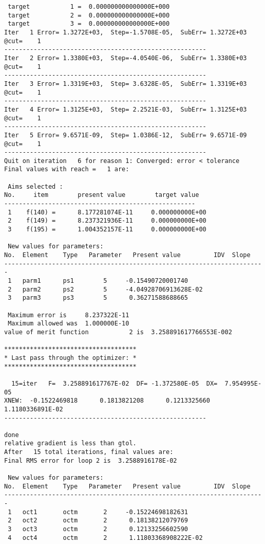 \begin{footnotesize}
\begin{verbatim}
 target           1 =  0.000000000000000E+000
 target           2 =  0.000000000000000E+000
 target           3 =  0.000000000000000E+000
Iter   1 Error= 1.3272E+03,  Step=-1.5708E-05,  SubErr= 1.3272E+03 @cut=    1
-------------------------------------------------------
Iter   2 Error= 1.3380E+03,  Step=-4.0540E-06,  SubErr= 1.3380E+03 @cut=    1
-------------------------------------------------------
Iter   3 Error= 1.3319E+03,  Step= 3.6328E-05,  SubErr= 1.3319E+03 @cut=    1
-------------------------------------------------------
Iter   4 Error= 1.3125E+03,  Step= 2.2521E-03,  SubErr= 1.3125E+03 @cut=    1
-------------------------------------------------------
Iter   5 Error= 9.6571E-09,  Step= 1.0386E-12,  SubErr= 9.6571E-09 @cut=    1
-------------------------------------------------------
Quit on iteration   6 for reason 1: Converged: error < tolerance
Final values with reach =   1 are:

 Aims selected :
No.     item        present value        target value
----------------------------------------------------
 1    f(140) =      8.177281074E-11     0.000000000E+00
 2    f(149) =      8.237321936E-11     0.000000000E+00
 3    f(195) =      1.004352157E-11     0.000000000E+00

 New values for parameters:
No.  Element    Type   Parameter   Present value         IDV  Slope
-----------------------------------------------------------------------
 1   parm1      ps1        5     -0.15490720001740
 2   parm2      ps2        5     -4.04928706913628E-02
 3   parm3      ps3        5      0.36271588688665

 Maximum error is     8.237322E-11
 Maximum allowed was  1.000000E-10
value of merit function           2 is  3.258891617766553E-002

************************************
* Last pass through the optimizer: *
************************************

  15=iter   F=  3.258891617767E-02  DF= -1.372580E-05  DX=  7.954995E-05
XNEW:  -0.1522469818      0.1813821208      0.1213325660      1.1180336891E-02
-------------------------------------------------------

done
relative gradient is less than gtol.
After   15 total iterations, final values are:
Final RMS error for loop 2 is  3.2588916178E-02

 New values for parameters:
No.  Element    Type   Parameter   Present value         IDV  Slope
-----------------------------------------------------------------------
 1   oct1       octm       2     -0.15224698182631
 2   oct2       octm       2      0.18138212079769
 3   oct3       octm       2      0.12133256602590
 4   oct4       octm       2      1.11803368908222E-02


\end{verbatim}
\end{footnotesize}
